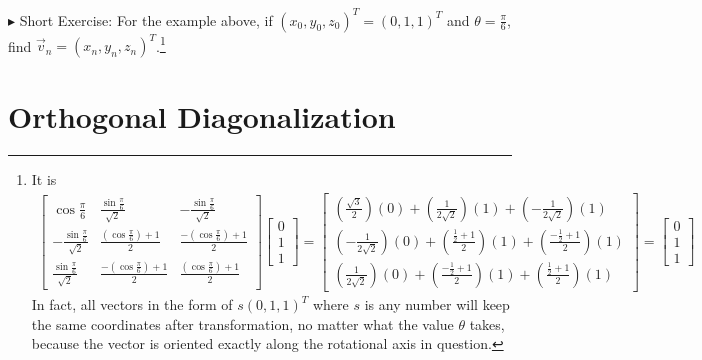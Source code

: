 $\blacktriangleright$ Short Exercise: For the example above, if $(x_0, y_0, z_0)^T = (0,1,1)^T$ and $\theta = \frac{\pi}{6}$, find $\vec{v}_n = (x_n, y_n, z_n)^T$.\footnote{It is
\begin{align*}
\begin{bmatrix}
\cos{\frac{\pi}{6}} & \frac{\sin{\frac{\pi}{6}}}{\sqrt{2}} & -\frac{\sin{\frac{\pi}{6}}}{\sqrt{2}} \\
-\frac{\sin{\frac{\pi}{6}}}{\sqrt{2}} & \frac{(\cos{\frac{\pi}{6}}) + 1}{2} & \frac{-(\cos{\frac{\pi}{6}}) + 1}{2} \\
\frac{\sin\frac{\pi}{6}}{\sqrt{2}} & \frac{-(\cos{\frac{\pi}{6}}) + 1}{2} & \frac{(\cos{\frac{\pi}{6}}) + 1}{2}
\end{bmatrix}
\begin{bmatrix}
0 \\
1 \\
1
\end{bmatrix}
=
\begin{bmatrix}
(\frac{\sqrt{3}}{2})(0) + (\frac{1}{2\sqrt{2}})(1) + (-\frac{1}{2\sqrt{2}})(1) \\
(-\frac{1}{2\sqrt{2}})(0) + (\frac{\frac{1}{2} + 1}{2})(1) + (\frac{-\frac{1}{2} + 1}{2})(1) \\
(\frac{1}{2\sqrt{2}})(0) + (\frac{-\frac{1}{2} + 1}{2})(1) + (\frac{\frac{1}{2} + 1}{2})(1)
\end{bmatrix}
=
\begin{bmatrix}
0 \\
1 \\
1
\end{bmatrix}
\end{align*}
In fact, all vectors in the form of $s(0,1,1)^T$ where $s$ is any number will keep the same coordinates after transformation, no matter what the value $\theta$ takes, because the vector is oriented exactly along the rotational axis in question.}

\section{Orthogonal Diagonalization}
\label{section:orthogonaldiagreal}

